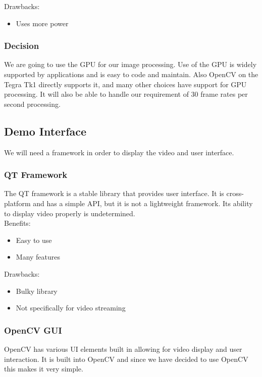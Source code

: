	Drawbacks:
	\begin{itemize}[leftmargin=2cm,labelindent=2cm]
		\item Uses more power\\
	\end{itemize}
	
	\subsubsection{Decision}
	We are going to use the GPU for our image processing. Use of the GPU is widely supported by applications and is easy to code and maintain. Also OpenCV on the Tegra Tk1 directly supports it, and many other choices have support for GPU processing. It will also be able to handle our requirement of 30 frame rates per second processing.
	
\subsection{Demo Interface}
We will need a framework in order to display the video and user interface.\\
	\subsubsection{QT Framework}
	The QT framework is a stable library that provides user interface.
It is cross-platform and has a simple API, but it is not a lightweight framework. Its ability to display video properly is undetermined.\\
			
	Benefits:
	\begin{itemize}[leftmargin=2cm,labelindent=2cm]
		\item Easy to use
		\item Many features
	\end{itemize}
	
	Drawbacks:
	\begin{itemize}[leftmargin=2cm,labelindent=2cm]
		\item Bulky library
		\item Not specifically for video streaming\\
	\end{itemize}
	
	\subsubsection{OpenCV GUI}
	OpenCV has various UI elements built in allowing for video display and user interaction. It is built into OpenCV and since we have decided to use OpenCV this makes it very simple.\\
		
